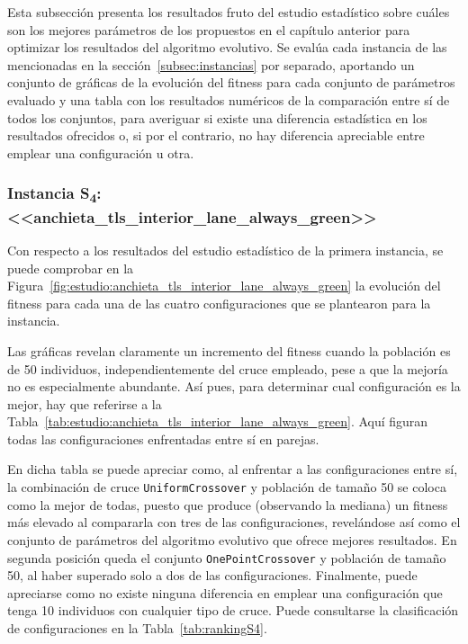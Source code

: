 Esta subsección presenta los resultados fruto del estudio estadístico sobre cuáles son los mejores parámetros de los propuestos en el capítulo anterior para optimizar los resultados del algoritmo evolutivo. Se evalúa cada instancia de las mencionadas en la sección~\ref{subsec:instancias} por separado, aportando un conjunto de gráficas de la evolución del fitness para cada conjunto de parámetros evaluado y una tabla con los resultados numéricos de la comparación entre sí de todos los conjuntos, para averiguar si existe una diferencia estadística en los resultados ofrecidos o, si por el contrario, no hay diferencia apreciable entre emplear una configuración u otra.

\subsubsection{Instancia S\textsubscript{4}: <<anchieta\_tls\_interior\_lane\_always\_green>>}


Con respecto a los resultados del estudio estadístico de la primera instancia, se puede comprobar en la Figura~\ref{fig:estudio:anchieta_tls_interior_lane_always_green} la evolución del fitness para cada una de las cuatro configuraciones que se plantearon para la instancia. 

Las gráficas revelan claramente un incremento del fitness cuando la población es de 50 individuos, independientemente del cruce empleado, pese a que la mejoría no es especialmente abundante. Así pues, para determinar cual configuración es la mejor, hay que referirse a la Tabla~\ref{tab:estudio:anchieta_tls_interior_lane_always_green}. Aquí figuran todas las configuraciones enfrentadas entre sí en parejas.

En dicha tabla se puede apreciar como, al enfrentar a las configuraciones entre sí, la combinación de cruce \texttt{UniformCrossover} y población de tamaño 50 se coloca como la mejor de todas, puesto que produce (observando la mediana) un fitness más elevado al compararla con tres de las configuraciones, revelándose así como el conjunto de parámetros del algoritmo evolutivo que ofrece mejores resultados. En segunda posición queda el conjunto \texttt{OnePointCrossover} y población de tamaño 50, al haber superado solo a dos de las configuraciones. Finalmente, puede apreciarse como no existe ninguna diferencia en emplear una configuración que tenga 10 individuos con cualquier tipo de cruce. Puede consultarse la clasificación de configuraciones en la Tabla~\ref{tab:rankingS4}.


